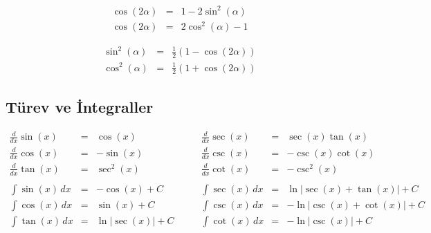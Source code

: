 \begin{eqnarray*}
\cos(2\alpha) &=& 1 - 2\sin^2(\alpha) \\
\cos(2\alpha) &=& 2\cos^2(\alpha) - 1
\end{eqnarray*}

\begin{eqnarray*}
\sin^2(\alpha) &=& \frac{1}{2}(1 - \cos(2\alpha)) \\
\cos^2(\alpha) &=& \frac{1}{2}(1 + \cos(2\alpha))
\end{eqnarray*}

\subsection*{Türev ve İntegraller}
\[
\begin{array}{rclrcl}
\frac{d}{dx}\sin(x) &=& \cos(x)\quad &\quad
\frac{d}{dx}\sec(x) &=& \sec(x)\tan(x)\\
\frac{d}{dx}\cos(x) &=& -\sin(x)\quad &\quad
\frac{d}{dx}\csc(x) &=& -\csc(x)\cot(x) \\
\frac{d}{dx}\tan(x) &=& \sec^2(x)\quad &\quad
\frac{d}{dx}\cot(x) &=& -\csc^2(x) \\
\\
\int\sin(x)\,dx &=& -\cos(x)+C\quad &\quad
\int\sec(x)\,dx &=& \ln|\sec(x)+\tan(x)|+C\\
\int\cos(x)\,dx &=& \sin(x)+C\quad &\quad
\int\csc(x)\,dx &=& -\ln|\csc(x)+\cot(x)|+C \\
\int\tan(x)\,dx &=& \ln|\sec(x)|+C\quad &\quad
\int\cot(x)\,dx &=& -\ln|\csc(x)|+C
\end{array}
\]
